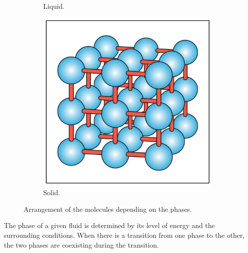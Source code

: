 \begin{figure}[h]
\begin{subfigure}[b]{0.3\textwidth}
         \caption{Liquid.}
         \label{fig:C2_liq}
     \end{subfigure}
     \begin{subfigure}[b]{0.3\textwidth}
         \centering
         \includegraphics[width=\textwidth]{Chapitre_2/Images/solid.png}
         \caption{Solid.}
         \label{fig:C2_sol}
     \end{subfigure}
        \caption{Arrangement of the molecules depending on the phases\cite{Boles2006}.}
        \label{fig:C2_phase}
\end{figure}

The phase of a given fluid is determined by its level of energy and the surrounding conditions. When there is a transition from one phase to the other, the two phases are coexisting during the transition.

